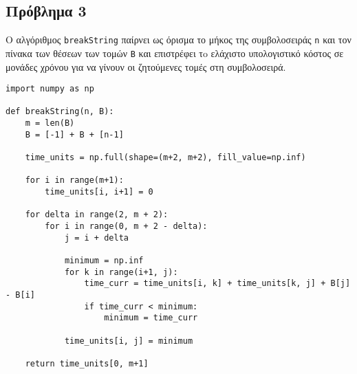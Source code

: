 \documentclass[12pt]{article}
\begin{document}
\subsection*{Πρόβλημα 3} 
Ο αλγόριθμος \texttt{breakString} παίρνει ως όρισμα το μήκος της συμβολοσειράς \texttt{n} και τον πίνακα των θέσεων των τομών \texttt{B} και επιστρέφει τo ελάχιστο υπολογιστικό κόστος σε μονάδες χρόνου για να γίνουν οι ζητούμενες τομές στη συμβολοσειρά. 
\begin{verbatim}
import numpy as np

def breakString(n, B):
    m = len(B)
    B = [-1] + B + [n-1]

    time_units = np.full(shape=(m+2, m+2), fill_value=np.inf)

    for i in range(m+1):
        time_units[i, i+1] = 0

    for delta in range(2, m + 2):
        for i in range(0, m + 2 - delta):
            j = i + delta

            minimum = np.inf
            for k in range(i+1, j):
                time_curr = time_units[i, k] + time_units[k, j] + B[j] - B[i]
                if time_curr < minimum:
                    minimum = time_curr

            time_units[i, j] = minimum

    return time_units[0, m+1]
\end{verbatim}
\end{document}
